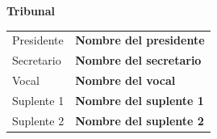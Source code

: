 \documentclass[../TFG.tex]{subfiles}
\begin{document}
\vspace{20pt}
{\setlength{\parindent}{6pt} \textbf{Tribunal}}

\noindent \begin{tabularx}{\textwidth}{p{3cm} X}
\hline
Presidente & \textbf{Nombre del presidente}   \\
Secretario & \textbf{Nombre del secretario}        \\
Vocal      & \textbf{Nombre del vocal} \\
Suplente 1 & \textbf{Nombre del suplente 1}           \\
Suplente 2 & \textbf{Nombre del suplente 2}       \\ \hline
\end{tabularx}
\normalsize
\paginablanco
\end{document}
